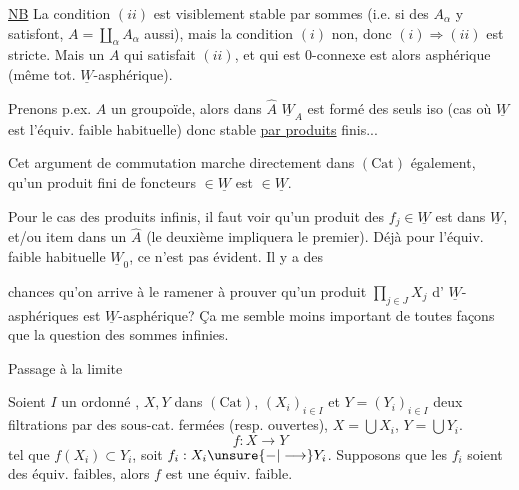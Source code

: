 
 \uline{NB} La condition $(ii)$ est visiblement stable par sommes (i.e. si des $A_\alpha$ y satisfont, $A=\coprod_\alpha A_\alpha$ aussi), mais la condition $(i)$ non, donc   $(i)\Longrightarrow(ii)$ est stricte. Mais un $A$ qui satisfait $(ii)$, et qui est $0$-connexe  est alors asphérique (même tot. $\underline W$-asphérique).

 Prenons p.ex.  $A$ un groupoïde, alors dans $\widehat A$ $\underline W_A$ est formé des seuls iso (cas où $\underline W$ est l'équiv. faible habituelle) donc stable \uline{par produits} finis...

Cet argument de commutation  marche directement dans $(\mathrm{Cat})$ également,   qu'un produit  fini de foncteurs $\in\underline W$ est $\in\underline W$.

Pour le cas des produits infinis, il faut voir qu'un produit des $f_j\in\underline W$ est dans $\underline W$,  et/ou item dans un $\widehat A$ (le deuxième impliquera le premier). Déjà pour l'équiv. faible habituelle $\underline W_0$, ce n'est pas évident. Il y a des

chances qu'on arrive à le ramener à prouver qu'un produit $\prod_{j\in J}X_j$ d' $\underline W$-asphériques est $\underline W$-asphérique? Ça me semble moins important de toutes façons que la question des sommes infinies.


Passage à la limite

\uline{} Soient $I$ un ordonné , $X,Y$ dans $(\mathrm{Cat})$, $(X_i)_{i\in I}$ et $Y=(Y_i)_{i\in I}$ deux filtrations par des sous-cat. fermées (resp. ouvertes),  $X=\bigcup X_i$, $Y=\bigcup Y_i$.
\[
f:X\longrightarrow Y
\]
tel que $f(X_i)\subset Y_i$, soit $f_i:X_i\unsure{\mathbin{-}|\longrightarrow}Y_i$.
Supposons que les $f_i$ soient des équiv. faibles, alors $f$ est une équiv. faible.



